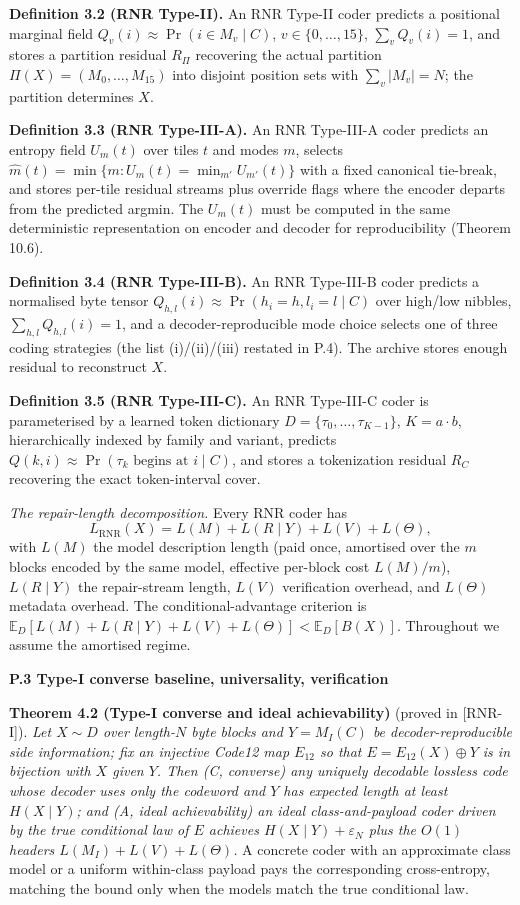 \documentclass[
]{article}
\begin{document}
\textbf{Definition 3.2 (RNR Type-II).} An RNR Type-II coder predicts a
positional marginal field $Q_v(i) \approx \Pr(i \in M_v \mid C)$,
$v \in \{0,\dots,15\}$, $\sum_v Q_v(i) = 1$, and stores a partition
residual $R_\Pi$ recovering the actual partition
$\Pi(X) = (M_0,\dots,M_{15})$ into disjoint position sets with
$\sum_v |M_v| = N$; the partition determines $X$.

\textbf{Definition 3.3 (RNR Type-III-A).} An RNR Type-III-A coder predicts
an entropy field $U_m(t)$ over tiles $t$ and modes $m$, selects
$\hat{m}(t) = \min\{m : U_m(t) = \min_{m'} U_{m'}(t)\}$ with a fixed
canonical tie-break, and stores per-tile residual streams plus override
flags where the encoder departs from the predicted argmin. The $U_m(t)$
must be computed in the same deterministic representation on encoder and
decoder for reproducibility (Theorem 10.6).

\textbf{Definition 3.4 (RNR Type-III-B).} An RNR Type-III-B coder predicts
a normalised byte tensor $Q_{h,l}(i) \approx \Pr(h_i=h, l_i=l \mid C)$
over high/low nibbles, $\sum_{h,l} Q_{h,l}(i) = 1$, and a
decoder-reproducible mode choice selects one of three coding strategies
(the list (i)/(ii)/(iii) restated in P.4). The archive stores enough
residual to reconstruct $X$.

\textbf{Definition 3.5 (RNR Type-III-C).} An RNR Type-III-C coder is
parameterised by a learned token dictionary
$D = \{\tau_0,\dots,\tau_{K-1}\}$, $K = a\cdot b$, hierarchically indexed by
family and variant, predicts $Q(k,i) \approx \Pr(\tau_k\text{ begins at }i
\mid C)$, and stores a tokenization residual $R_C$ recovering the exact
token-interval cover.

\emph{The repair-length decomposition.} Every RNR coder has
\[
L_{\text{RNR}}(X) = L(M) + L(R \mid Y) + L(V) + L(\Theta),
\tag{3.1}
\]
with $L(M)$ the model description length (paid once, amortised over the
$m$ blocks encoded by the same model, effective per-block cost $L(M)/m$),
$L(R\mid Y)$ the repair-stream length, $L(V)$ verification overhead, and
$L(\Theta)$ metadata overhead. The conditional-advantage criterion is
$\mathbb{E}_D[L(M) + L(R\mid Y) + L(V) + L(\Theta)] < \mathbb{E}_D[B(X)]$.
Throughout we assume the amortised regime.

\textbf{P.3 Type-I converse baseline, universality, verification}

\textbf{Theorem 4.2 (Type-I converse and ideal achievability)} (proved in
[RNR-I]). \emph{Let $X \sim D$ over length-$N$ byte blocks and
$Y = M_I(C)$ be decoder-reproducible side information; fix an injective
Code12 map $E_{12}$ so that $E = E_{12}(X)\oplus Y$ is in bijection with $X$
given $Y$. Then (C, converse) any uniquely decodable lossless code whose
decoder uses only the codeword and $Y$ has expected length at least
$H(X\mid Y)$; and (A, ideal achievability) an ideal class-and-payload
coder driven by the true conditional law of $E$ achieves
$H(X\mid Y) + \varepsilon_N$ plus the $O(1)$ headers
$L(M_I)+L(V)+L(\Theta)$.} A concrete coder with an approximate class model
or a uniform within-class payload pays the corresponding cross-entropy,
matching the bound only when the models match the true conditional law.
\end{document}
